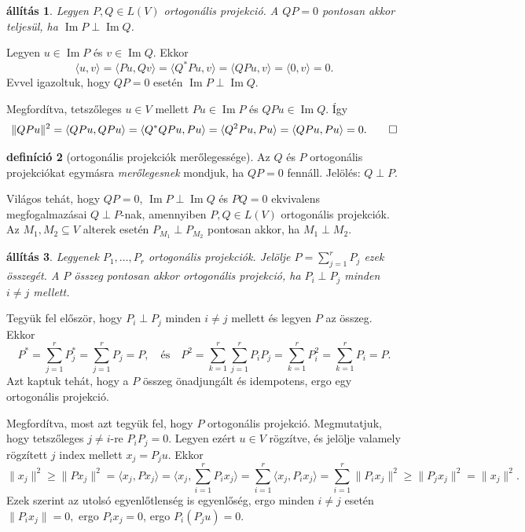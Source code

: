 \documentclass[a4paper, showtrims]{memoir}
\makeatletter
\renewenvironment{proof}[1][\proofname]
    {\par\pushQED{\qed}%
    \normalfont \topsep6\p@\@plus6\p@\relax
    \trivlist
    \item[\hskip\labelsep
        \itshape
    #1\@addpunct{:}]\ignorespaces}
    {\popQED\endtrivlist\@endpefalse}
\theoremstyle{plain}
\newtheorem{proposition}{állítás}[chapter]
\theoremstyle{remark}
\theoremstyle{definition}
\newtheorem{definition}[proposition]{definíció}
\DeclareMathOperator{\im}{Im}
\newcommand{\ip}[2]{\langle#1,#2\rangle}
\makeatother
\begin{document}
\begin{proposition}
	Legyen $P,Q\in L\left( V \right)$ ortogonális projekció.
	A $QP=0$ pontosan akkor teljesül, ha $\im P\perp\im Q$.
\end{proposition}
\begin{proof}
	Legyen $u\in \im P$ és $v\in \im Q$.
	Ekkor
	\[
		\ip{u}{v}
		=
		\ip{Pu}{Qv}
		=
		\ip{Q^\ast Pu}{v}
		=
		\ip{QPu}{v}
		=
		\ip{0}{v}
		=
		0.
	\]
	Evvel igazoltuk, hogy $QP=0$ esetén $\im P\perp\im Q$.

	Megfordítva, tetszőleges $u\in V$ mellett $Pu\in\im P$ és $QPu\in\im Q$.
	Így
	\[
		\|QPu\|^2
		=
		\ip{QPu}{QPu}
		=
		\ip{Q^\ast QPu}{Pu}
		=
		\ip{Q^2Pu}{Pu}
		=
		\ip{QPu}{Pu}
		=
		0.
		\qedhere
	\]
\end{proof}
\begin{definition}[ortogonális projekciók merőlegessége]
	Az $Q$ és $P$ ortogonális projekciókat egymásra \emph{merőlegesnek} mondjuk, ha $QP=0$ fennáll.
	Jelölés: $Q\perp P$.
\end{definition}
Világos tehát, hogy $QP=0$, $\im P\perp \im Q$ és $PQ=0$ ekvivalens megfogalmazásai $Q\perp P$-nak,
amennyiben $P,Q\in L\left( V \right)$ ortogonális projekciók.
Az $M_1, M_2\subseteq V$ alterek esetén $P_{M_1}\perp P_{M_2}$ pontosan akkor, ha $M_1\perp M_2$.
\begin{proposition}
	Legyenek $P_1,\ldots,P_r$ ortogonális projekciók.
	Jelölje $P=\sum_{j=1}^rP_j$ ezek összegét.
	A $P$ összeg pontosan akkor ortogonális projekció, ha $P_i\perp P_j$ minden $i\neq j$ mellett.
\end{proposition}
\begin{proof}
    Tegyük fel először, hogy $P_i\perp P_j$ minden $i\neq j$ mellett és legyen $P$ az összeg.
    Ekkor
    \[
        P^\ast
        =
        \sum_{j=1}^rP_j^\ast
        =
        \sum_{j=1}^rP_j
        =
        P,
        \quad\text{és}\quad
        P^2
        =
        \sum_{k=1}^r\sum_{j=1}^rP_iP_j
        =
        \sum_{k=1}^rP_i^2
        =
        \sum_{k=1}^rP_i
        =
        P.
    \]
    Azt kaptuk tehát, hogy a $P$ összeg önadjungált és idempotens,
    ergo egy ortogonális projekció.

    Megfordítva, most azt tegyük fel, hogy $P$ ortogonális projekció.
    Megmutatjuk, hogy tetszőleges $j\neq i$-re
    $P_iP_j=0$.
    Legyen ezért $u\in V$ rögzítve, és jelölje valamely rögzített $j$ index mellett $x_j=P_ju$.
    Ekkor
    \[
        \|x_j\|^2
        \geq
        \|Px_j\|^2
        =
        \ip{x_j}{Px_j}
        =
        \ip{x_j}{\sum_{i=1}^rP_ix_j}
        =
        \sum_{i=1}^r\ip{x_j}{P_ix_j}
        =
        \sum_{i=1}^r\|P_ix_j\|^2
        \geq
        \|P_jx_j\|^2
        =
        \|x_j\|^2.
    \]
    Ezek szerint az utolsó egyenlőtlenség is egyenlőség, 
    ergo minden $i\neq j$ esetén
    \(
    \|P_ix_j\|=0,
    \)
    ergo
    \(P_ix_j=0\),
    ergo
    $P_i\left( P_ju \right)=0.$
\end{proof}
\end{document}

